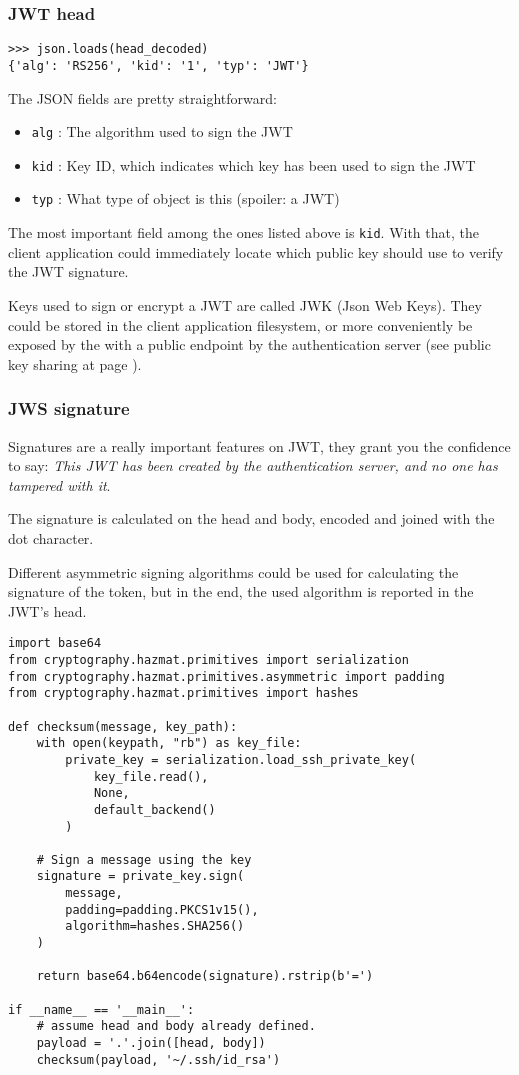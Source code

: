 \subsubsection{JWT head}
\begin{lstlisting}
>>> json.loads(head_decoded)
{'alg': 'RS256', 'kid': '1', 'typ': 'JWT'}
\end{lstlisting}
The JSON fields are pretty straightforward:
\begin{itemize}
    \item \texttt{alg} : The algorithm used to sign the JWT
    \item \texttt{kid} : Key ID, which indicates which key has been used to sign the JWT
    \item \texttt{typ} : What type of object is this (spoiler: a JWT)
\end{itemize}

The most important field among the ones listed above is \texttt{kid}.
With that, the client application could immediately locate which public key should use to verify the
JWT signature.

Keys used to sign or encrypt a JWT are called JWK (Json Web Keys).
They could be stored in the client application filesystem, or more conveniently
be exposed by the with a public endpoint by the authentication server (see public key sharing at page \pageref{jwks}).

\subsubsection{JWS signature}
Signatures are a really important features on JWT, they grant you the
confidence to say: \textit{This JWT has been created by the authentication
server, and no one has tampered with it}.

The signature is calculated on the head and body, encoded and joined with the
dot character.

Different asymmetric signing algorithms could be used for calculating the
signature of the token, but in the end, the used algorithm is reported in the
JWT's head.

\begin{lstlisting}[caption=Calculate JWT checksum]
import base64
from cryptography.hazmat.primitives import serialization
from cryptography.hazmat.primitives.asymmetric import padding
from cryptography.hazmat.primitives import hashes

def checksum(message, key_path):
    with open(keypath, "rb") as key_file:
        private_key = serialization.load_ssh_private_key(
            key_file.read(),
            None,
            default_backend()
        )

    # Sign a message using the key
    signature = private_key.sign(
        message,
        padding=padding.PKCS1v15(),
        algorithm=hashes.SHA256()
    )

    return base64.b64encode(signature).rstrip(b'=')

if __name__ == '__main__':
    # assume head and body already defined.
    payload = '.'.join([head, body])
    checksum(payload, '~/.ssh/id_rsa')
\end{lstlisting}

